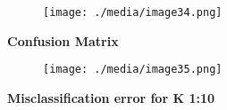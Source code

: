 \documentclass[12pt]{article}
\begin{document}

\begin{figure}[H]
	\begin{Center}
		\texttt{[image: ./media/image34.png]}
	\end{Center}
\end{figure}



\par

\begin{justify}
\textbf{Confusion Matrix}
\end{justify}\par




\begin{figure}[H]
	\begin{Center}
		\texttt{[image: ./media/image35.png]}
	\end{Center}
\end{figure}



\par


\vspace{\baselineskip}

\vspace{\baselineskip}

\vspace{\baselineskip}

\vspace{\baselineskip}

\vspace{\baselineskip}
\begin{adjustwidth}{1.5in}{0.0in}
\begin{justify}
\textbf{Misclassification error for K 1:10}
\end{justify}\par

\end{adjustwidth}



\end{document}
